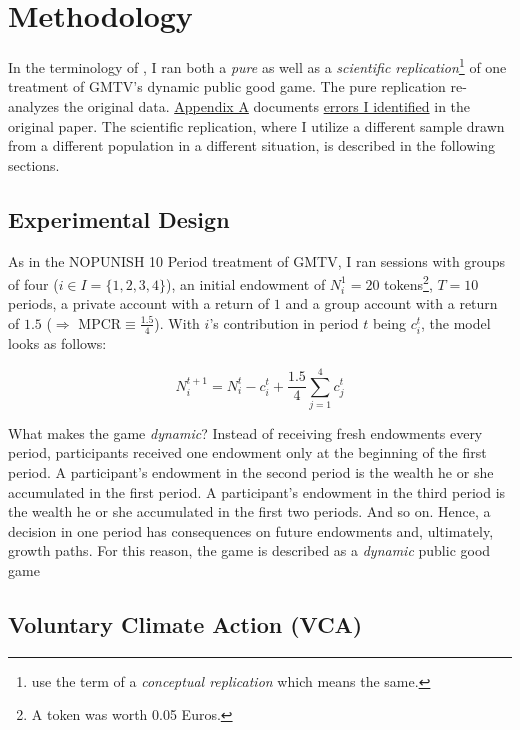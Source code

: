 \documentclass[
  authoryear,
  preprint,
  3p]{elsarticle}
\begin{document}
\hypertarget{sec-methods}{%
\section{Methodology}\label{sec-methods}}

In the terminology of \citet{Hamermesh2007}, I ran both a \emph{pure} as
well as a \emph{scientific replication}\footnote{\citet{Parsons2022} use
  the term of a \emph{conceptual replication} which means the same.} of
one treatment of GMTV's dynamic public good game. The pure replication
re-analyzes the original data.
\protect\hyperlink{A:-Pure-Replication}{Appendix A} documents
\href{}{errors I identified} in the original paper. The scientific
replication, where I utilize a different sample drawn from a different
population in a different situation, is described in the following
sections.

\hypertarget{sec-design}{%
\subsection{Experimental Design}\label{sec-design}}

As in the NOPUNISH 10 Period treatment of GMTV, I ran sessions with
groups of four (\(i \in I=\{1,2,3,4\}\)), an initial endowment of
\(N_i^1 = 20\) tokens\footnote{A token was worth 0.05 Euros.}, \(T=10\)
periods, a private account with a return of \(1\) and a group account
with a return of \(1.5\) (\(\Rightarrow\) MPCR\(\equiv \frac{1.5}{4}\)).
With \(i\)'s contribution in period \(t\) being \(c_i^t\), the model
looks as follows:

\[
N_i^{t+1}=N_i^t - c_i^t + \frac{1.5}{4}\sum_{j=1}^4 c_j^t
\]

What makes the game \emph{dynamic}? Instead of receiving fresh
endowments every period, participants received one endowment only at the
beginning of the first period. A participant's endowment in the second
period is the wealth he or she accumulated in the first period. A
participant's endowment in the third period is the wealth he or she
accumulated in the first two periods. And so on. Hence, a decision in
one period has consequences on future endowments and, ultimately, growth
paths. For this reason, the game is described as a \emph{dynamic} public
good game

\hypertarget{voluntary-climate-action-vca}{%
\subsection{Voluntary Climate Action
(VCA)}\label{voluntary-climate-action-vca}}
\end{document}
